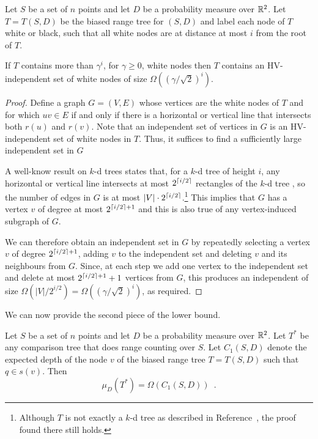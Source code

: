 \documentclass{patmorin}
\begin{document}
\begin{lem}
Let $S$ be a set of $n$ points and let $D$ be a probability measure
over $\mathbb{R}^2$.  Let $T=T(S,D)$ be the biased range tree for $(S,D)$ and
label each node of $T$ white or black, such that all white nodes are at
distance at most $i$ from the root of $T$.

If $T$ contains more than $\gamma^i$, for $\gamma\ge 0$, white
nodes then $T$ contains an HV-independent set of white nodes of size
$\Omega((\gamma/\sqrt{2})^i)$.
\end{lem}

\begin{proof}
Define a graph $G=(V,E)$ whose vertices are the white nodes of $T$ and
for which $uv\in E$ if and only if there is a horizontal or vertical
line that intersects both $r(u)$ and $r(v)$.  Note that an independent
set of vertices in $G$ is an HV-independent set of white nodes in $T$.
Thus, it suffices to find a sufficiently large independent set in $G$

A well-know result on $k$-d trees states that, for a $k$-d tree of height
$i$, any horizontal or vertical line intersects at most $2^{\left\lceil i/2 \right\rceil}$
rectangles of the $k$-d tree \cite[Lemma~5.4]{bkos97}, so the number of
edges in $G$ is at most $|V|\cdot 2^{\left\lceil i/2 \right\rceil}$.\footnote{Although $T$
is not exactly a $k$-d tree as described in Reference~\cite{bkos97},
the proof found there still holds.}  This implies that $G$ has a vertex
$v$ of degree at most $2^{\left\lceil i/2 \right\rceil+1}$ and this is also true of any
vertex-induced subgraph of $G$.

We can therefore obtain an independent set in $G$ by repeatedly
selecting a vertex $v$ of degree $2^{\left\lceil i/2 \right\rceil+1}$, adding $v$ to the
independent set and deleting $v$ and its neighbours from $G$.  Since,
at each step we add one vertex to the independent set and delete at most
$2^{\left\lceil i/2 \right\rceil+1}+1$ vertices from $G$, this produces an independent of
size $\Omega(|V|/2^{i/2}) = \Omega((\gamma/\sqrt{2})^i)$, as required.
\end{proof}

We can now provide the second piece of the lower bound.

\begin{lem}
Let $S$ be a set of $n$ points and let $D$ be a probability measure
over $\mathbb{R}^2$.
Let $T^*$ be any comparison tree that does range counting over $S$. Let
$C_1(S,D)$ denote the expected depth of the node $v$ of the biased
range tree $T=T(S,D)$ such that $q\in s(v)$.  Then
\[
    \mu_D(T^*) = \Omega(C_1(S,D)) \enspace .
\]
\end{lem}
\end{document}

